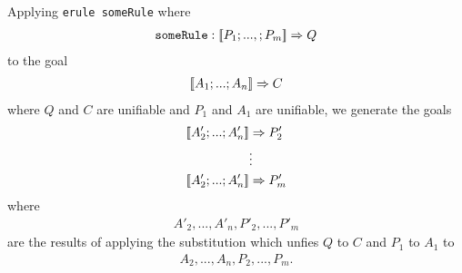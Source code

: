 \documentclass{article}
\begin{document}
\begin{definition}
    Applying \texttt{erule someRule} where
    \begin{align*}
        \texttt{someRule} : [\![P_1;...,;P_m]\!] \Rightarrow Q
    \end{align*}
    to the goal
    \begin{align*}
        [\![A_1; ...; A_n]\!] \Rightarrow C
    \end{align*}
    where $Q$ and $C$ are unifiable and $P_1$ and $A_1$ are unifiable, we generate the goals
    \begin{align*}
        \db{A'_2; ...; A'_n} &\Rightarrow P'_2\\
        &\vdots \\
        \db{A'_2; ...; A'_n} &\Rightarrow P'_m
    \end{align*}
    where \begin{align*}
        A'_2, ..., A'_n,P'_2,...,P'_m
    \end{align*}
    are the results of applying the
    substitution which unfies $Q$ to $C$ and $P_1$ to $A_1$ to
    \begin{align*}
        A_2,...,A_n,P_2,...,P_m.
    \end{align*}
\end{definition}
\end{document}
